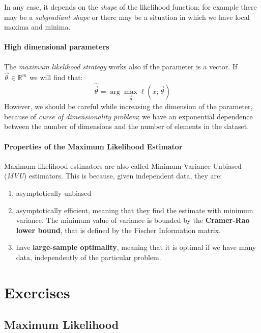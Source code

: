 In any case, it depends on the \textit{shape} of the likelihood function; for example there may be a \textit{subgradiant shape} or there may be a situation in which we have local maxima and minima.

\paragraph*{High dimensional parameters}
The \textit{maximum likelihood strategy} works also if the parameter is a vector. If $\vec{\theta} \in \mathbb{R}^m$ we will find that:
\[
    \hat{\vec{\theta}} = \arg\max_{\vec{\theta}}  \ell(x; \vec{\theta})
\]
However, we should be careful while increasing the dimension of the parameter, because of \textit{curse of dimensionality problem}; we have an exponential dependence between the number of dimensions and the number of elements in the dataset.

\paragraph*{Properties of the Maximum Likelihood Estimator}
Maximum likelihood estimators are also called Minimum-Variance Unbiased (\textit{MVU}) estimators. This is because, given independent data, they are:
\begin{enumerate}
    \item asymptotically unbiased
    \item asymptotically efficient, meaning that they find the estimate with minimum variance. The minimum value of variance is bounded by the \textbf{Cramer-Rao lower bound}, that is defined by the Fischer Information matrix.
    \item have \textbf{large-sample optimality}, meaning that it is optimal if we have many data, independently of the particular problem.
\end{enumerate}


\section{Exercises}
\subsection{Maximum Likelihood}
